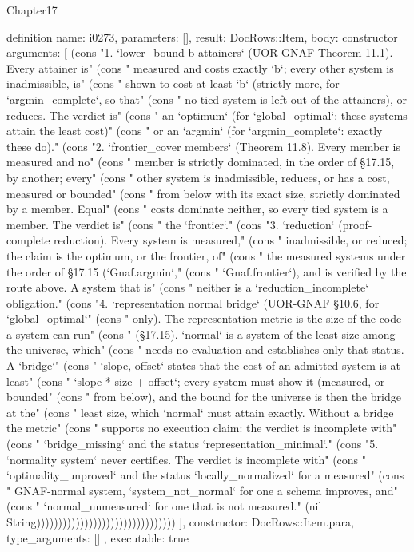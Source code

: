\begin{lexlean}{Chapter17}
\begin{semanticmodule}
definition{
  name: i0273,
  parameters: [],
  result: DocRows::Item,
  body: constructor{
    arguments: [
      (cons "1. `lower_bound b attainers` (UOR-GNAF Theorem 11.1). Every attainer is" (cons "   measured and costs exactly `b`; every other system is inadmissible, is" (cons "   shown to cost at least `b` (strictly more, for `argmin_complete`, so that" (cons "   no tied system is left out of the attainers), or reduces. The verdict is" (cons "   an `optimum` (for `global_optimal`: these systems attain the least cost)" (cons "   or an `argmin` (for `argmin_complete`: exactly these do)." (cons "2. `frontier_cover members` (Theorem 11.8). Every member is measured and no" (cons "   member is strictly dominated, in the order of §17.15, by another; every" (cons "   other system is inadmissible, reduces, or has a cost, measured or bounded" (cons "   from below with its exact size, strictly dominated by a member. Equal" (cons "   costs dominate neither, so every tied system is a member. The verdict is" (cons "   the `frontier`." (cons "3. `reduction` (proof-complete reduction). Every system is measured," (cons "   inadmissible, or reduced; the claim is the optimum, or the frontier, of" (cons "   the measured systems under the order of §17.15 (`Gnaf.argmin`," (cons "   `Gnaf.frontier`), and is verified by the route above. A system that is" (cons "   neither is a `reduction_incomplete` obligation." (cons "4. `representation normal bridge` (UOR-GNAF §10.6, for `global_optimal`" (cons "   only). The representation metric is the size of the code a system can run" (cons "   (§17.15). `normal` is a system of the least size among the universe, which" (cons "   needs no evaluation and establishes only that status. A `bridge`" (cons "   `{slope, offset}` states that the cost of an admitted system is at least" (cons "   `slope * size + offset`; every system must show it (measured, or bounded" (cons "   from below), and the bound for the universe is then the bridge at the" (cons "   least size, which `normal` must attain exactly. Without a bridge the metric" (cons "   supports no execution claim: the verdict is incomplete with" (cons "   `bridge_missing` and the status `representation_minimal`." (cons "5. `normality system` never certifies. The verdict is incomplete with" (cons "   `optimality_unproved` and the status `locally_normalized` for a measured" (cons "   GNAF-normal system, `system_not_normal` for one a schema improves, and" (cons "   `normal_unmeasured` for one that is not measured." (nil String))))))))))))))))))))))))))))))))
    ],
    constructor: DocRows::Item.para,
    type_arguments: []
  },
  executable: true
}


\end{semanticmodule}
\end{lexlean}
